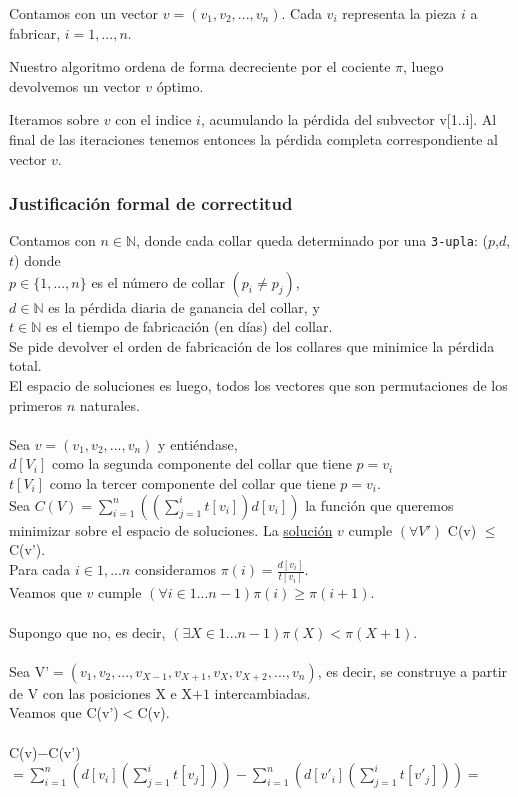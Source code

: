 \documentclass[11pt, a4paper, twoside]{article}
\begin{document}
Contamos con un vector $v = (v_1,v_2,...,v_n)$. Cada $v_i$ representa la pieza
$i$ a fabricar, $i=1,...,n$.

Nuestro algoritmo ordena de forma decreciente por el cociente $\pi$, luego
devolvemos un vector $v$ óptimo.

Iteramos sobre $v$ con el indice $i$, acumulando la pérdida del subvector
v[1..i]. Al final de las iteraciones tenemos entonces la pérdida completa
correspondiente al vector $v$.


\subsubsection{Justificación formal de correctitud}

Contamos con $n \in \mathbb{N}$, donde cada collar queda determinado por una \texttt{3-upla}: ($p$,$d$,$t$) donde \\
$p \in \{1,...,n\}$ es el número de collar $(p_i \neq p_j)$, \\
$d \in \mathbb{N}$ es la pérdida diaria de ganancia del collar, y \\
$t \in \mathbb{N}$ es el tiempo de fabricación (en días) del collar. \\
Se pide devolver el orden de fabricación de los collares que minimice la pérdida total. \\
El espacio de soluciones es luego, todos los vectores que son permutaciones de los primeros $n$ naturales. \\
\\
Sea $v = (v_1,v_2,...,v_n)$ y entiéndase, \\
$d[V_i]$ como la segunda componente del collar que tiene $p=v_i$ \\
$t[V_i]$ como la tercer componente del collar que tiene $p=v_i$. \\
Sea $\displaystyle{C(V)= \sum_{i=1}^{n} ((\sum_{j=1}^{i} t[v_i])d[v_i])}$ la función que queremos minimizar sobre el espacio de soluciones. La \underline{solución} $v$ cumple $(\forall V')$ C(v) $\le$ C(v').\\
Para cada $i \in 1,...n$ consideramos $\displaystyle{ \pi(i)= \frac{d[v_i]}{t[v_i]}}$. \\
Veamos que $v$ cumple $\displaystyle{(\forall i \in 1...n-1) \pi(i) \ge \pi(i+1)}$. \\
\\
Supongo que no, es decir, $\displaystyle{(\exists X \in 1...n-1) \pi(X) < \pi(X+1)}$. \\
\\
Sea V'$=(v_1,v_2,...,v_{X-1},v_{X+1},v_X,v_{X+2},...,v_n)$, es decir, se construye a partir de V con las posiciones X e X$+1$ intercambiadas. \\
Veamos que C(v')$<$C(v). \\
\\
C(v)$-$C(v')$= \displaystyle {\sum_{i=1}^{n} (d[v_i](\sum_{j=1}^{i} t[v_j]))- \sum_{i=1}^{n}(d[v'_i](\sum_{j=1}^{i} t[v'_j]))} = $\\
\end{document}
